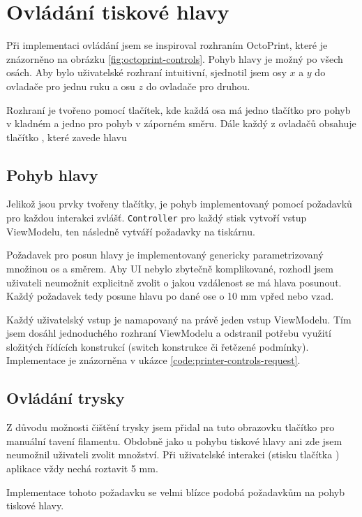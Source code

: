 \section{Ovládání tiskové hlavy}

Při implementaci ovládání jsem se inspiroval rozhraním OctoPrint, které je znázorněno na obrázku \ref{fig:octoprint-controls}.
Pohyb hlavy je možný po všech osách.
Aby bylo uživatelské rozhraní intuitivní, sjednotil jsem osy $x$ a $y$ do ovladače pro jednu ruku a osu $z$ do ovladače pro druhou.


Rozhraní je tvořeno pomocí tlačítek, kde každá osa má jedno tlačítko pro pohyb v kladném a jedno pro pohyb v záporném směru.
Dále každý z ovladačů obsahuje tlačítko , které zavede hlavu 

\subsection{Pohyb hlavy}

Jelikož jsou prvky tvořeny tlačítky, je pohyb implementovaný pomocí požadavků pro každou interakci zvlášť.
\texttt{Controller} pro každý stisk vytvoří vstup ViewModelu, ten následně vytváří požadavky na tiskárnu.

Požadavek pro posun hlavy je implementovaný genericky parametrizovaný množinou os a směrem.
Aby UI nebylo zbytečně komplikované, rozhodl jsem uživateli neumožnit explicitně zvolit o jakou vzdálenost se má hlava posunout.
Každý požadavek tedy posune hlavu po dané ose o 10 mm vpřed nebo vzad.

Každý uživatelský vstup je namapovaný na právě jeden vstup ViewModelu.
Tím jsem dosáhl jednoduchého rozhraní ViewModelu a odstranil potřebu využití složitých řídících konstrukcí (switch konstrukce či řetězené podmínky).
Implementace je znázorněna v ukázce \ref{code:printer-controls-request}.


\subsection{Ovládání trysky}

Z důvodu možnosti čištění trysky jsem přidal na tuto obrazovku tlačítko pro manuální tavení filamentu.
Obdobně jako u pohybu tiskové hlavy ani zde jsem neumožnil uživateli zvolit množství.
Při uživatelské interakci (stisku tlačítka ) aplikace vždy nechá roztavit 5 mm.

Implementace tohoto požadavku se velmi blízce podobá požadavkům na pohyb tiskové hlavy.
